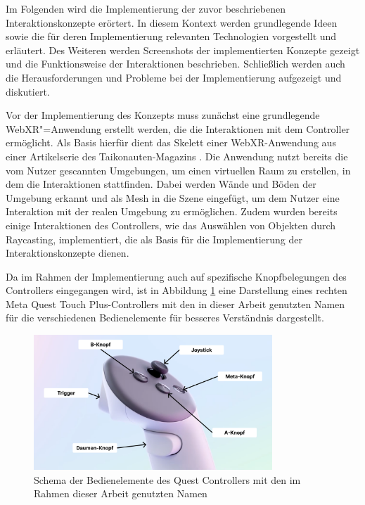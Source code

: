 Im Folgenden wird die Implementierung der zuvor beschriebenen Interaktionskonzepte erörtert.
In diesem Kontext werden grundlegende Ideen sowie die für deren Implementierung relevanten Technologien vorgestellt und erläutert.
Des Weiteren werden Screenshots der implementierten Konzepte gezeigt und die Funktionsweise der Interaktionen beschrieben.
Schließlich werden auch die Herausforderungen und Probleme bei der Implementierung aufgezeigt und diskutiert.

Vor der Implementierung des Konzepts muss zunächst eine grundlegende WebXR"=Anwendung erstellt werden, die die Interaktionen mit dem Controller ermöglicht.
Als Basis hierfür dient das Skelett einer WebXR-Anwendung aus einer Artikelserie des Taikonauten-Magazins \autocite[][]{taikonauten-magazine}. 
Die Anwendung nutzt bereits die vom Nutzer gescannten Umgebungen, um einen virtuellen Raum zu erstellen, in dem die Interaktionen stattfinden.
Dabei werden Wände und Böden der Umgebung erkannt und als Mesh in die Szene eingefügt, um dem Nutzer eine Interaktion mit der realen Umgebung zu ermöglichen.
Zudem wurden bereits einige Interaktionen des Controllers, wie das Auswählen von Objekten durch Raycasting, implementiert, die als Basis für die Implementierung der Interaktionskonzepte dienen.

Da im Rahmen der Implementierung auch auf spezifische Knopfbelegungen des Controllers eingegangen wird, ist in Abbildung \ref{fig:controller-names} eine Darstellung eines rechten Meta Quest Touch Plus-Controllers mit den in dieser Arbeit genutzten Namen für die verschiedenen Bedienelemente für besseres Verständnis dargestellt.

\begin{figure}[H]
    \centering
    \includegraphics[width=0.8\textwidth]{images/QuestControllerButtons.png}
    \caption{Schema der Bedienelemente des Quest Controllers mit den im Rahmen dieser Arbeit genutzten Namen}
    \label{fig:controller-names}
\end{figure}

